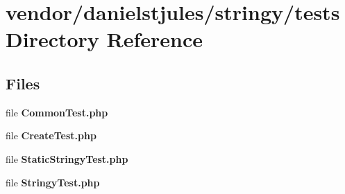 \section{vendor/danielstjules/stringy/tests Directory Reference}
\label{dir_eaddc0c30d74590b07af3b6d2bed9249}
\subsection*{Files}
\begin{DoxyCompactItemize}
\item 
file {\bf Common\+Test.\+php}
\item 
file {\bf Create\+Test.\+php}
\item 
file {\bf Static\+Stringy\+Test.\+php}
\item 
file {\bf Stringy\+Test.\+php}
\end{DoxyCompactItemize}
